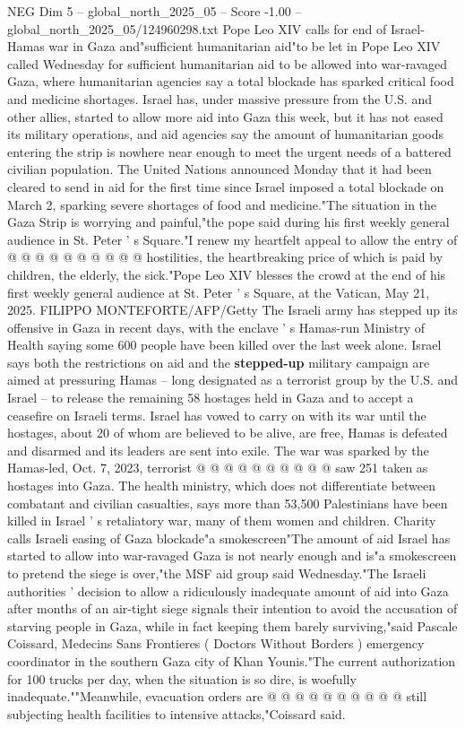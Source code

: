 \begin{textsample}{NEG Dim 5 – global\_north\_2025\_05 – Score -1.00 – global\_north\_2025\_05/124960298.txt}  \label{ex:f5_neg_371}
Pope Leo XIV calls for end of Israel-Hamas war in Gaza and"sufficient humanitarian aid"to be let in Pope Leo XIV called Wednesday for sufficient humanitarian aid to be allowed into war-ravaged Gaza, where humanitarian agencies say a total blockade has sparked critical food and medicine shortages.
Israel has, under massive pressure from the U.S. and other allies, started to allow more aid into Gaza this week, but it has not eased its military operations, and aid agencies say the amount of humanitarian goods entering the strip is nowhere near enough to meet the urgent needs of a battered civilian population.
The United Nations announced Monday that it had been cleared to send in aid for the first time since Israel imposed a total blockade on March 2, sparking severe shortages of food and medicine."The situation in the Gaza Strip is worrying and painful,"the pope said during his first weekly general audience in St.
Peter ' s Square."I renew my heartfelt appeal to allow the entry of @ @ @ @ @ @ @ @ @ @ hostilities, the heartbreaking price of which is paid by children, the elderly, the sick."Pope Leo XIV blesses the crowd at the end of his first weekly general audience at St.
Peter ' s Square, at the Vatican, May 21, 2025.
FILIPPO MONTEFORTE/AFP/Getty The Israeli army has stepped up its offensive in Gaza in recent days, with the enclave ' s Hamas-run Ministry of Health saying some 600 people have been killed over the last week alone.
Israel says both the restrictions on aid and the \textbf{stepped-up} military campaign are aimed at pressuring Hamas -- long designated as a terrorist group by the U.S. and Israel -- to release the remaining 58 hostages held in Gaza and to accept a ceasefire on Israeli terms.
Israel has vowed to carry on with its war until the hostages, about 20 of whom are believed to be alive, are free, Hamas is defeated and disarmed and its leaders are sent into exile.
The war was sparked by the Hamas-led, Oct. 7, 2023, terrorist @ @ @ @ @ @ @ @ @ @ saw 251 taken as hostages into Gaza.
The health ministry, which does not differentiate between combatant and civilian casualties, says more than 53,500 Palestinians have been killed in Israel ' s retaliatory war, many of them women and children.
Charity calls Israeli easing of Gaza blockade"a smokescreen"The amount of aid Israel has started to allow into war-ravaged Gaza is not nearly enough and is"a smokescreen to pretend the siege is over,"the MSF aid group said Wednesday."The Israeli authorities ' decision to allow a ridiculously inadequate amount of aid into Gaza after months of an air-tight siege signals their intention to avoid the accusation of starving people in Gaza, while in fact keeping them barely surviving,"said Pascale Coissard, Medecins Sans Frontieres ( Doctors Without Borders ) emergency coordinator in the southern Gaza city of Khan Younis."The current authorization for 100 trucks per day, when the situation is so dire, is woefully inadequate.""Meanwhile, evacuation orders are @ @ @ @ @ @ @ @ @ @ still subjecting health facilities to intensive attacks,"Coissard said.

\end{textsample}
